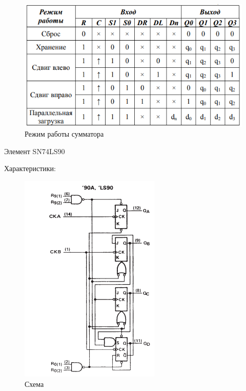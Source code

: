 \begin{figure}[H]
	\centering
	\includegraphics[width=0.85\linewidth]{imgs/11/11_tab}
	\caption{Режим работы сумматора}
	\label{fig:13_tab}
\end{figure}

Элемент SN74LS90

Характеристики:

\begin{figure}[H]
	\centering
	\includegraphics[width=0.95\linewidth]{imgs/13/13_sh}
	\caption{Схема}
	\label{fig:13_sh}
\end{figure}

